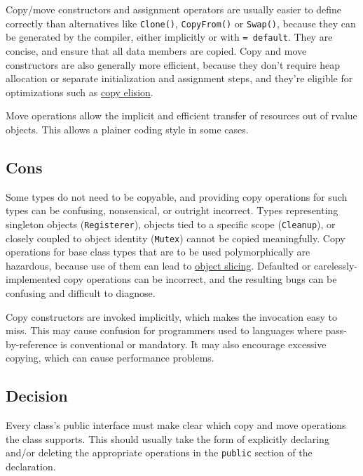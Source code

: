 Copy/move constructors and assignment operators are usually easier to define correctly than alternatives like \texttt{Clone()}, \texttt{CopyFrom()} or \texttt{Swap()}, because they can be generated by the compiler, either implicitly or with \texttt{= default}. They are concise, and ensure that all data members are copied. Copy and move constructors are also generally more efficient, because they don't require heap allocation or separate initialization and assignment steps, and they're eligible for optimizations such as \href{http://en.cppreference.com/w/cpp/language/copy_elision}{copy elision}.

Move operations allow the implicit and efficient transfer of resources out of rvalue objects. This allows a plainer coding style in some cases.


\subsection{Cons}
Some types do not need to be copyable, and providing copy operations for such types can be confusing, nonsensical, or outright incorrect. Types representing singleton objects (\texttt{Registerer}), objects tied to a specific scope (\texttt{Cleanup}), or closely coupled to object identity (\texttt{Mutex}) cannot be copied meaningfully. Copy operations for base class types that are to be used polymorphically are hazardous, because use of them can lead to \href{https://en.wikipedia.org/wiki/Object_slicing}{object slicing}. Defaulted or carelessly-implemented copy operations can be incorrect, and the resulting bugs can be confusing and difficult to diagnose.

Copy constructors are invoked implicitly, which makes the invocation easy to miss. This may cause confusion for programmers used to languages where pass-by-reference is conventional or mandatory. It may also encourage excessive copying, which can cause performance problems.

\subsection{Decision}
Every class's public interface must make clear which copy and move operations the class supports. This should usually take the form of explicitly declaring and/or deleting the appropriate operations in the \texttt{public} section of the declaration.

